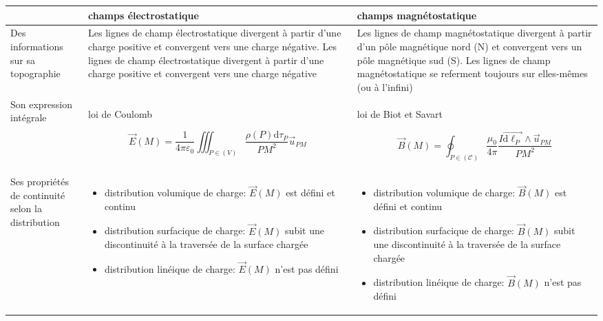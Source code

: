\documentclass[a4paper,12pt]{book}
\begin{document}
\begin{landscape}
\begin{table}[h]
    \centering

    \begin{tabular}{|m{4cm}<{\centering}|m{10cm}<{\centering}|m{10cm}<{\centering}|}
    \hline
     & champs électrostatique & champs magnétostatique  \\
    \hline
    Des informations sur sa topographie & Les lignes de champ électrostatique divergent à partir d'une charge positive et convergent
vers une charge négative. Les lignes de champ électrostatique divergent à partir d'une charge positive et convergent
vers une charge négative
&
Les lignes de champ magnétostatique divergent à partir d'un pôle magnétique nord (N) et convergent vers un pôle magnétique sud (S). 
Les lignes de champ magnétostatique se referment toujours sur elles-mêmes (ou à l'infini)\\ \hline 
    
    
    Son expression intégrale 
    & loi de Coulomb

        $$\vec{E}(M)=\frac{1}{4 \pi \varepsilon_{0}} \iiint_{P \in(V)} \frac{\rho(P) \mathrm{d} \tau_{P}}{P M^{2}} \vec{u}_{P M}$$

    & loi de Biot et Savart

    $$\vec{B}(M)=\oint_{P \in(\mathscr{C})} \frac{\mu_{0}}{4 \pi} \frac{I \overrightarrow{\mathrm{d} \ell_{P}} \wedge \vec{u}_{P M}}{P M^{2}}$$
    
    \\ \hline
    
    
    Ses propriétés de continuité selon la distribution 
    &
\begin{itemize}
    \item distribution volumique de charge: $\vec{E}(M)$ est défini et continu
    \item distribution surfacique de charge: $\vec{E}(M)$ subit une discontinuité à
    la traversée de la surface chargée
    \item distribution linéique de charge: $\vec{E}(M)$ n'est pas défini
\end{itemize}

    & 
    \begin{itemize}
        \item distribution volumique de charge: $\vec{B}(M)$ est défini et continu
        \item distribution surfacique de charge: $\vec{B}(M)$ subit une discontinuité à
        la traversée de la surface chargée
        \item distribution linéique de charge: $\vec{B}(M)$ n'est pas défini
    \end{itemize}
    

\end{tabular}
\end{table}
\end{landscape}
\end{document}
